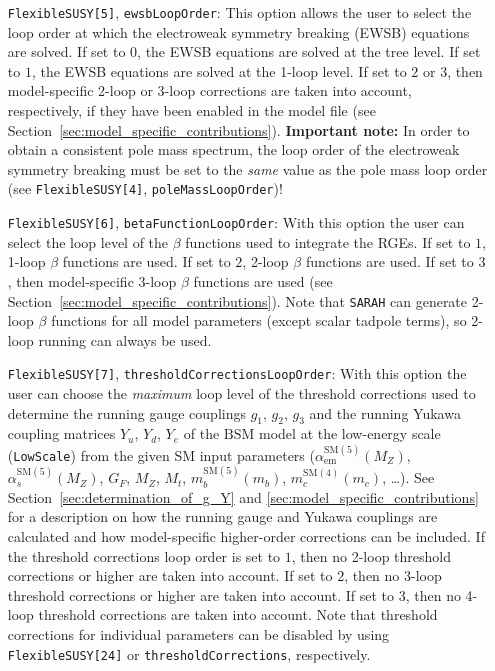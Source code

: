 \documentclass[final,3p,11pt,pdflatex]{elsarticle}
\makeatletter
\newcommand{\sarah}{\texttt{SARAH}\@\xspace}
\newcommand{\code}[1]{\lstinline|#1|}  %
\newcommand{\SM}{\ensuremath{\text{SM}}\xspace}
\newcommand{\BSM}{\ensuremath{\text{BSM}}\xspace}
\newcommand{\secref}[1]{Section~\ref{#1}}
\def\as{\alpha_s}
\def\aem{\alpha_{\text{em}}}
\makeatother
\begin{document}
\begin{itemize}
\item[\texttt{FlexibleSUSY[5]},] \texttt{ewsbLoopOrder}: This option
  allows the user to select the loop order at which the electroweak
  symmetry breaking (EWSB) equations are solved.  If set to $0$, the
  EWSB equations are solved at the tree level.  If set to $1$, the
  EWSB equations are solved at the 1-loop level.  If set to $2$ or
  $3$, then model-specific 2-loop or 3-loop corrections are taken into
  account, respectively, if they have been enabled in the model file (see
  \secref{sec:model_specific_contributions}).  \textbf{Important
    note:} In order to obtain a consistent pole mass spectrum, the
  loop order of the electroweak symmetry breaking must be set to the
  \emph{same} value as the pole mass loop order (see
  \texttt{FlexibleSUSY[4]}, \texttt{poleMassLoopOrder})!

\item[\texttt{FlexibleSUSY[6]},] \texttt{betaFunctionLoopOrder}: With
  this option the user can select the loop level of the $\beta$
  functions used to integrate the RGEs.  If set to $1$, 1-loop $\beta$
  functions are used.  If set to $2$, 2-loop $\beta$ functions are used.  If
  set to $3$, then model-specific 3-loop $\beta$ functions are used (see
  \secref{sec:model_specific_contributions}).  Note that \sarah can
  generate 2-loop $\beta$ functions for all model parameters (except
  scalar tadpole terms), so 2-loop running can always be used.

\item[\texttt{FlexibleSUSY[7]},]
  \texttt{thresholdCorrectionsLoopOrder}: With this option the user
  can choose the \emph{maximum} loop level of the threshold corrections
  used to determine the running gauge couplings $g_1$, $g_2$, $g_3$
  and the running Yukawa coupling matrices $Y_u$, $Y_d$, $Y_e$ of the
  \BSM model at the low-energy scale (\code{LowScale}) from the given
  SM input parameters ($\aem^{\SM(5)}(M_Z)$,
  $\as^{\SM(5)}(M_Z)$, $G_F$, $M_Z$, $M_t$, $m_b^{\SM(5)}(m_b)$,
  $m_c^{\SM(4)}(m_c)$, \ldots).  See \secref{sec:determination_of_g_Y}
  and \ref{sec:model_specific_contributions} for a description on how
  the running gauge and Yukawa couplings are calculated and how
  model-specific higher-order corrections can be included.  If the
  threshold corrections loop order is set to $1$, then no 2-loop
  threshold corrections or higher are taken into account.  If set to
  $2$, then no 3-loop threshold corrections or higher are taken into
  account.  If set to $3$, then no 4-loop threshold corrections are
  taken into account.
  Note that threshold corrections for individual parameters can be
  disabled by using \texttt{FlexibleSUSY[24]} or
  \texttt{thresholdCorrections}, respectively.


\end{itemize}
\end{document}
